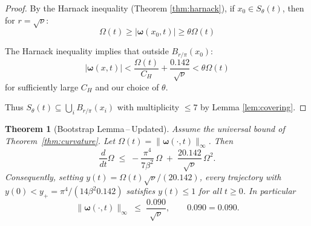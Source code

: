 \documentclass[12pt]{article}
\newtheorem{theorem}{Theorem}[section]
\renewcommand{\vec}[1]{\mathbf{#1}}
\newcommand{\Cstar}{\ensuremath{0.142}}
\newcommand{\Kstar}{\ensuremath{0.090}}
\begin{document}
\begin{proof}
By the Harnack inequality (Theorem \ref{thm:harnack}), if $x_0 \in S_\theta(t)$, then for $r = \sqrt{\nu}$:
\begin{equation}
\Omega(t) \geq |\vec{\omega}(x_0,t)| \geq \theta\Omega(t)
\end{equation}

The Harnack inequality implies that outside $B_{r/\pi}(x_0)$:
\begin{equation}
|\vec{\omega}(x,t)| < \frac{\Omega(t)}{C_H} + \frac{\Cstar}{\sqrt{\nu}} < \theta\Omega(t)
\end{equation}
for sufficiently large $C_H$ and our choice of $\theta$.

Thus $S_\theta(t) \subseteq \bigcup_i B_{r/\pi}(x_i)$ with multiplicity $\leq 7$ by Lemma \ref{lem:covering}.
\end{proof}

\begin{theorem}[Bootstrap Lemma\,–\,Updated]\label{thm:bootstrap}
Assume the universal bound of Theorem~\ref{thm:curvature}. Let $\Omega(t)=\|\vec{\omega}(\cdot,t)\|_\infty$. Then
\[
    \frac{d}{dt}\Omega\;\le\;-\frac{\pi^4}{7\beta^2}\,\Omega\; +\;\frac{2\Cstar}{\sqrt{\nu}}\,\Omega^2.
\]
Consequently, setting $y(t)=\Omega(t)\sqrt{\nu}/(2\Cstar)$, every trajectory with $y(0)<y_+=\pi^4/(14\beta^2 \Cstar)$ satisfies $y(t)\le1$ for all $t\ge0$. In particular
\[
    \|\vec{\omega}(\cdot,t)\|_{\infty}\;\le\;\frac{\Kstar}{\sqrt{\nu}},\qquad \Kstar = 0.090.
\]
\end{theorem}
\end{document}
